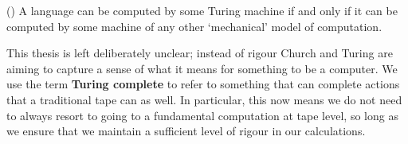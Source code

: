 \begin{tcthesis}
    (\cite{https://doi.org/10.1112/plms/s2-42.1.230}) A language can be computed by some Turing machine if and only if it can be computed by some machine of any other `mechanical' model of computation.
\end{tcthesis}

This thesis is left deliberately unclear; instead of rigour Church and Turing are aiming to capture a sense of what it means for something to be a computer. We use the term \textbf{Turing complete} to refer to something that can complete actions that a traditional tape can as well. In particular, this now means we do not need to always resort to going to a fundamental computation at tape level, so long as we ensure that we maintain a sufficient level of rigour in our calculations.